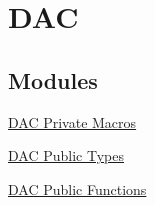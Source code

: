 \hypertarget{group___d_a_c}{\section{\-D\-A\-C}
\label{group___d_a_c}
}
\subsection*{\-Modules}
\begin{DoxyCompactItemize}
\item 
\hyperlink{group___d_a_c___private___macros}{\-D\-A\-C Private Macros}
\item 
\hyperlink{group___d_a_c___public___types}{\-D\-A\-C Public Types}
\item 
\hyperlink{group___d_a_c___public___functions}{\-D\-A\-C Public Functions}
\end{DoxyCompactItemize}
